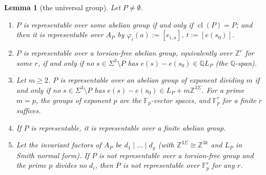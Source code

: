\documentclass[11pt]{article}
\newtheorem{lemma}[theorem]{Lemma}
\theoremstyle{definition}
\theoremstyle{remark}
\newcommand{\Z}{\mathbb{Z}}
\newcommand{\Fp}{\mathbb{F}_p}
\newcommand{\Q}{\mathbb{Q}}
\DeclareMathOperator{\cl}{cl}
\begin{document}
\begin{lemma}[the universal group]\label{g:lem:universal}
Let $P\ne\emptyset$.
\begin{enumerate}[label=\textup{(\alph*)}]
\item $P$ is representable over some abelian group if and only if $\cl(P)=P$; and then it is representable over $A_P$ by $\varphi_i(a):=[e_{i,a}]$, $t:=[e(s_0)]$.
\item $P$ is representable over a torsion-free abelian group, equivalently over $\Z^r$ for some $r$, if and only if no $s\in\Sigma^3\setminus P$ has $e(s)-e(s_0)\in\Q L_P$ (the $\Q$-span).
\item Let $m\ge2$. $P$ is representable over an abelian group of exponent dividing $m$ if and only if no $s\in\Sigma^3\setminus P$ has $e(s)-e(s_0)\in L_P+m\Z^{3\Sigma}$. For a prime $m=p$, the groups of exponent $p$ are the $\Fp$-vector spaces, and $\Fp^r$ for a finite $r$ suffices.
\item If $P$ is representable, it is representable over a finite abelian group.
\item Let the invariant factors of $A_P$ be $d_1\mid\dots\mid d_\varrho$ (with $\Z^{3\Sigma}\cong\Z^{3k}$ and $L_P$ in Smith normal form). If $P$ is not representable over a torsion-free group and the prime $p$ divides no $d_i$, then $P$ is not representable over $\Fp^r$ for any $r$.
\end{enumerate}
\end{lemma}
\end{document}
